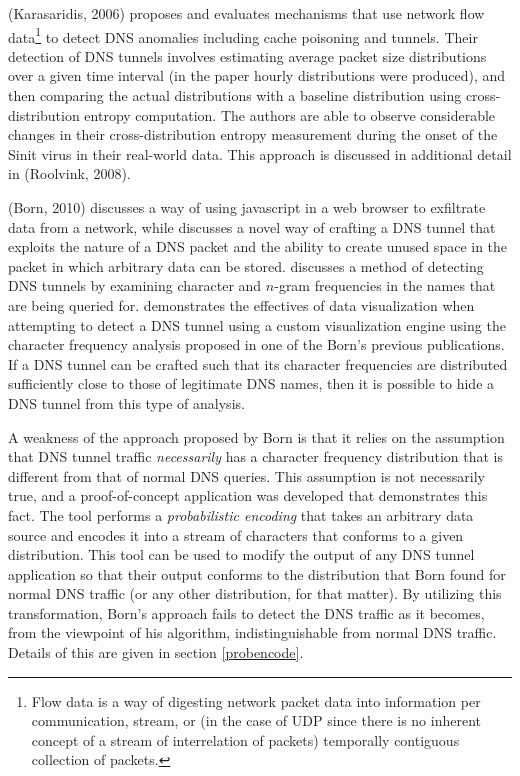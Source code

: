 \documentclass[12pt]{report}
\theoremstyle{remark}
\theoremstyle{definition}
\theoremstyle{definition}
\theoremstyle{definition}
\begin{document}
(Karasaridis, 2006)\cite{Karasaridis2006} proposes and evaluates mechanisms that
use network flow data\footnote{Flow data is a way of digesting network packet
data into information per communication, stream, or (in the case of UDP since
there is no inherent concept of a stream of interrelation of packets) temporally
contiguous collection of packets.} to detect DNS anomalies including cache
poisoning and tunnels. Their detection of DNS tunnels involves estimating
average packet size distributions over a given time interval (in the paper
hourly distributions were produced), and then comparing the actual distributions
with a baseline distribution using cross-distribution entropy computation. The
authors are able to observe considerable changes in their cross-distribution
entropy measurement during the onset of the Sinit virus in their real-world
data. This approach is discussed in additional detail in (Roolvink,
2008)\cite{Roolvink2008}.

(Born, 2010)\cite{Born2010.exfil} discusses a way of using javascript in a web
browser to exfiltrate data from a network, while \cite{Born2010.psudp} discusses
a novel way of crafting a DNS tunnel that exploits the nature of a DNS packet
and the ability to create unused space in the packet in which arbitrary data can
be stored. \cite{Born2010.cfa} discusses a method of detecting DNS tunnels by
examining character and $n$-gram frequencies in the names that are being queried
for. \cite{Born2010.ngviz} demonstrates the effectives of data visualization
when attempting to detect a DNS tunnel using a custom visualization engine using
the character frequency analysis proposed in one of the Born's previous
publications. If a DNS tunnel can be crafted such that its character frequencies
are distributed sufficiently close to those of legitimate DNS names, then it is
possible to hide a DNS tunnel from this type of analysis.

A weakness of the approach proposed by Born is that it relies on the assumption
that DNS tunnel traffic \emph{necessarily} has a character frequency
distribution that is different from that of normal DNS queries. This assumption
is not necessarily true, and a proof-of-concept application
was developed that demonstrates this fact. The tool performs a
\emph{probabilistic encoding} that takes an arbitrary data source and encodes
it into a stream of characters that conforms to a given distribution. This tool
can be used to modify the output of any DNS tunnel application so that their
output conforms to the distribution that Born found for normal DNS traffic (or
any other distribution, for that matter). By
utilizing this transformation, Born's approach fails to detect the DNS traffic
as it becomes, from the viewpoint of his algorithm, indistinguishable from
normal DNS traffic. Details of this are given in section \ref{probencode}.
\end{document}
